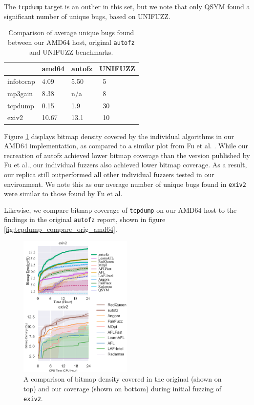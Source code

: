 The \texttt{tcpdump} target is an outlier in this set, but we note that only QSYM found 
a significant number of unique bugs, based on UNIFUZZ. 

\begin{table}[ht!]
    \begin{tabular}{llll}
        \toprule
         & amd64 & autofz\cite{fu_autofz_2023} & UNIFUZZ\cite{li_unifuzz_2021} \\
        \midrule
        infotocap & 4.09 & 5.50 & ~5 \\
        mp3gain & 8.38 & n/a & ~8 \\
        tcpdump & 0.15 & 1.9 &  ~30 \\
        exiv2 & 10.67 & 13.1 & ~10 \\
        \bottomrule
    \end{tabular}
    \caption{Comparison of average unique bugs found between our AMD64 host, original
    \texttt{autofz} and UNIFUZZ benchmarks.}
    \label{amd64-benchmark-comparison}
\end{table}

Figure \ref{fig:exiv2_compare_orig_amd64} displays bitmap density covered by the individual 
algorithms in our AMD64 implementation, as compared to a similar plot from Fu et al.
\cite{fu_autofz_2023}. While our recreation of autofz achieved lower bitmap coverage than 
the version published by Fu et al., our individual fuzzers also achieved lower bitmap 
coverage. As a result, our replica still outperformed all other individual fuzzers tested 
in our environment. We note this as our average number of unique bugs found in \texttt{exiv2} 
were similar to those found by Fu et al. 

Likewise, we compare bitmap coverage of \texttt{tcpdump} on our AMD64 host to the findings 
in the original \texttt{autofz} report\cite{fu_autofz_2023}, shown in figure 
\ref{fig:tcpdump_compare_orig_amd64}.

\begin{figure}[ht!]
    \includegraphics[width=0.5\textwidth]{figs/exiv2_compare_orig_amd64.png}
    \centering
    \caption{A comparison of bitmap density covered in the original\cite{fu_autofz_2023} (shown 
    on top) and our coverage (shown on bottom) during initial fuzzing of \texttt{exiv2}.}
    \label{fig:exiv2_compare_orig_amd64}
\end{figure}


